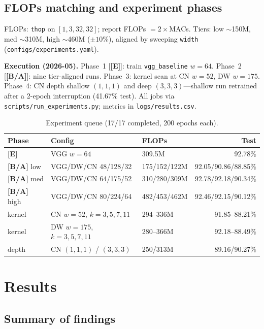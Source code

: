 \documentclass{article}
\newcommand{\grade}[1]{\textbf{\textcolor{blue!70!black}{[#1]}}}
\begin{document}
\subsection{FLOPs matching and experiment phases}

FLOPs: \texttt{thop} on $[1,3,32,32]$; report FLOPs $= 2\times$MACs. Tiers: low $\sim$150M, med $\sim$310M, high $\sim$460M ($\pm10\%$), aligned by sweeping \texttt{width} (\texttt{configs/experiments.yaml}).

\textbf{Execution (2026-05).} Phase~1 [\grade{E}]: train \texttt{vgg\_baseline} $w{=}64$. Phase~2 [\grade{B/A}]: nine tier-aligned runs. Phase~3: kernel scan at CN $w{=}52$, DW $w{=}175$. Phase~4: CN depth shallow $(1,1,1)$ and deep $(3,3,3)$---shallow run retrained after a 2-epoch interruption (41.67\% test). All jobs via \texttt{scripts/run\_experiments.py}; metrics in \texttt{logs/results.csv}.

\begin{table}[t]
  \caption{Experiment queue (17/17 completed, 200 epochs each).}
  \label{tab:queue}
  \centering
  \scriptsize
  \setlength{\tabcolsep}{1.5pt}
  \begin{tabular}{@{}lllr@{}}
    \toprule
    Phase & Config & FLOPs & Test \\
    \midrule
    \grade{E} & VGG $w{=}64$ & 309.5M & 92.78\% \\
    \grade{B/A} low & VGG/DW/CN 48/128/32 & 175/152/122M & 92.05/90.86/88.85\% \\
    \grade{B/A} med & VGG/DW/CN 64/175/52 & 310/280/309M & 92.78/92.18/90.34\% \\
    \grade{B/A} high & VGG/DW/CN 80/224/64 & 482/453/462M & 92.46/92.15/90.12\% \\
    kernel & CN $w{=}52$, $k{=}3,5,7,11$ & 294--336M & 91.85--88.21\% \\
    kernel & DW $w{=}175$, $k{=}3,5,7,11$ & 280--366M & 92.18--88.49\% \\
    depth & CN $(1,1,1)$ / $(3,3,3)$ & 250/313M & 89.16/90.27\% \\
    \bottomrule
  \end{tabular}
\end{table}

\section{Results}
\label{sec:results}

\subsection{Summary of findings}
\end{document}
